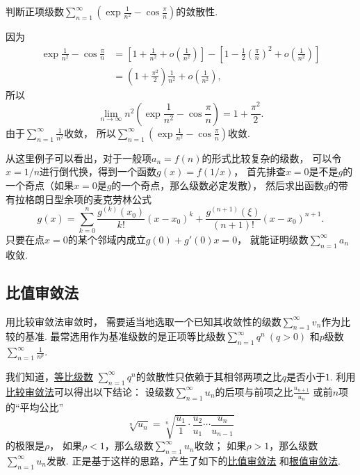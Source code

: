 \begin{example}
判断正项级数\(\sum_{n=1}^\infty \left(\exp\frac1{n^2}-\cos\frac\pi{n}\right)\)的敛散性.
\begin{solution}
因为\begin{align*}
	\exp\frac1{n^2}-\cos\frac\pi{n}
	&= \left[1+\frac1{n^2}+o\left(\frac1{n^2}\right)\right]
	- \left[1-\frac12\left(\frac\pi{n}\right)^2+o\left(\frac1{n^2}\right)\right] \\
	&= \left(1+\frac{\pi^2}2\right) \frac1{n^2} + o\left(\frac1{n^2}\right),
\end{align*}
所以\[
	\lim_{n\to\infty} n^2 \left(\exp\frac1{n^2}-\cos\frac\pi{n}\right)
	= 1+\frac{\pi^2}2.
\]
由于\(\sum_{n=1}^\infty \frac1{n^2}\)收敛，
所以\(\sum_{n=1}^\infty \left(\exp\frac1{n^2}-\cos\frac\pi{n}\right)\)收敛.
\end{solution}
\end{example}
\begin{remark}
从这里例子可以看出，对于一般项\(a_n = f(n)\)的形式比较复杂的级数，
可以令\(x = 1/n\)进行倒代换，得到一个函数\(g(x) = f(1/x)\)，
首先排查\(x=0\)是不是\(g\)的一个奇点（如果\(x=0\)是\(g\)的一个奇点，那么级数必定发散），
然后求出函数\(g\)的带有拉格朗日型余项的麦克劳林公式\[
	g(x) = \sum_{k=0}^n \frac{g^{(k)}(x_0)}{k!} (x-x_0)^k
	+ \frac{g^{(n+1)}(\xi)}{(n+1)!} (x-x_0)^{n+1}.
\]
只要在点\(x=0\)的某个邻域内成立\(g(0) + g'(0) x = 0\)，
就能证明级数\(\sum_{n=1}^\infty a_n\)收敛.
\end{remark}

\subsection{比值审敛法}
用比较审敛法审敛时，
需要适当地选取一个已知其收敛性的级数\(\sum_{n=1}^\infty v_n\)作为比较的基准.
最常选用作为基准级数的是正项等比级数\(\sum_{n=1}^\infty q^n\ (q>0)\)
和\(p\)级数\(\sum_{n=1}^\infty \frac1{n^p}\).

我们知道，\hyperref[example:无穷级数.等比级数的收敛性]{等比级数}
\(\sum_{n=1}^\infty q^n\)的敛散性只依赖于其相邻两项之比\(q\)是否小于\(1\).
利用\hyperref[theorem:无穷级数.正项级数的比较审敛法]{比较审敛法}可以得出以下结论：
设级数\(\sum_{n=1}^\infty u_n\)的后项与前项之比\(\frac{u_{n+1}}{u_n}\)
或前\(n\)项的“平均公比”\[
	\sqrt[n]{u_n}
	= \sqrt[n]{\frac{u_1}1\cdot\frac{u_2}{u_1}\dotsm\frac{u_n}{u_{n-1}}}
\]的极限是\(\rho\)，
如果\(\rho<1\)，那么级数\(\sum_{n=1}^\infty u_n\)收敛；
如果\(\rho>1\)，那么级数\(\sum_{n=1}^\infty u_n\)发散.
正是基于这样的思路，产生了如下的\hyperref[theorem:无穷级数.正项级数的比值审敛法]{比值审敛法}%
和\hyperref[theorem:无穷级数.正项级数的根值审敛法]{根值审敛法}.

